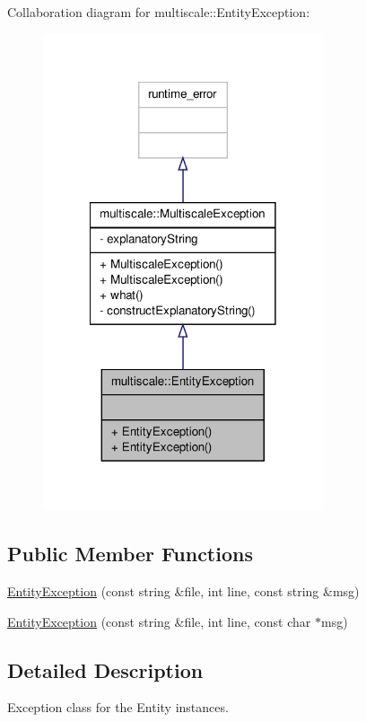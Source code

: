 Collaboration diagram for multiscale\-:\-:Entity\-Exception\-:
\nopagebreak
\begin{figure}[H]
\begin{center}
\leavevmode
\includegraphics[width=234pt]{classmultiscale_1_1EntityException__coll__graph}
\end{center}
\end{figure}
\subsection*{Public Member Functions}
\begin{DoxyCompactItemize}
\item 
\hyperlink{classmultiscale_1_1EntityException_a8e0ef42ea6ab6ac863f64f8859a5002a}{Entity\-Exception} (const string \&file, int line, const string \&msg)
\item 
\hyperlink{classmultiscale_1_1EntityException_a62f57c4bcc93e31adbd5ca1bb40d4b0d}{Entity\-Exception} (const string \&file, int line, const char $\ast$msg)
\end{DoxyCompactItemize}


\subsection{Detailed Description}
Exception class for the Entity instances. 

